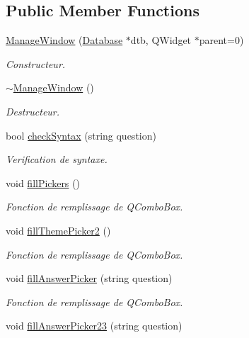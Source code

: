 \subsection*{Public Member Functions}
\begin{DoxyCompactItemize}
\item 
\mbox{\hyperlink{classManageWindow_ab5bd55471f7e1a749810dd28fcc7b9c0}{Manage\+Window}} (\mbox{\hyperlink{classDatabase}{Database}} $\ast$dtb, Q\+Widget $\ast$parent=0)
\begin{DoxyCompactList}\small\item\em Constructeur. \end{DoxyCompactList}\item 
\mbox{\hyperlink{classManageWindow_a7ce02d4018de7f914756c13aa5b965fd}{$\sim$\+Manage\+Window}} ()
\begin{DoxyCompactList}\small\item\em Destructeur. \end{DoxyCompactList}\item 
bool \mbox{\hyperlink{classManageWindow_aac50125bb2e62a8e9905c4c5a09c6184}{check\+Syntax}} (string question)
\begin{DoxyCompactList}\small\item\em Verification de syntaxe. \end{DoxyCompactList}\item 
void \mbox{\hyperlink{classManageWindow_a746f794bbc9b2aa007fc4ccd2a8504d8}{fill\+Pickers}} ()
\begin{DoxyCompactList}\small\item\em Fonction de remplissage de Q\+Combo\+Box. \end{DoxyCompactList}\item 
void \mbox{\hyperlink{classManageWindow_a1ce0be0aaeb2a8809004aa6a0316c6b9}{fill\+Theme\+Picker2}} ()
\begin{DoxyCompactList}\small\item\em Fonction de remplissage de Q\+Combo\+Box. \end{DoxyCompactList}\item 
void \mbox{\hyperlink{classManageWindow_a1276d421282259be54035b2137a71ccf}{fill\+Answer\+Picker}} (string question)
\begin{DoxyCompactList}\small\item\em Fonction de remplissage de Q\+Combo\+Box. \end{DoxyCompactList}\item 
void \mbox{\hyperlink{classManageWindow_a40b1c990354a0df80a73889eb78dc02b}{fill\+Answer\+Picker23}} (string question)

\end{DoxyCompactItemize}

